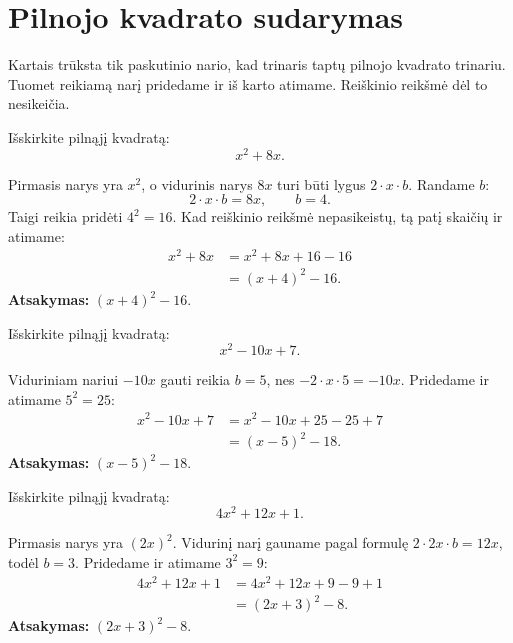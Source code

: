 \documentclass[11pt,a4paper]{scrartcl}
\begin{document}
\section{Pilnojo kvadrato sudarymas}

Kartais trūksta tik paskutinio nario, kad trinaris taptų pilnojo kvadrato trinariu. Tuomet reikiamą narį pridedame ir iš karto atimame. Reiškinio reikšmė dėl to nesikeičia.

\begin{example}
Išskirkite pilnąjį kvadratą:
\[
x^2+8x.
\]
\end{example}
\begin{solution}
Pirmasis narys yra $x^2$, o vidurinis narys $8x$ turi būti lygus $2\cdot x\cdot b$. Randame $b$:
\[
2\cdot x\cdot b=8x, \qquad b=4.
\]
Taigi reikia pridėti $4^2=16$. Kad reiškinio reikšmė nepasikeistų, tą patį skaičių ir atimame:
\[
\begin{aligned}
x^2+8x
&=x^2+8x+16-16\\
&=(x+4)^2-16.
\end{aligned}
\]
\textbf{Atsakymas:} $(x+4)^2-16$.
\end{solution}

\begin{example}
Išskirkite pilnąjį kvadratą:
\[
x^2-10x+7.
\]
\end{example}
\begin{solution}
Viduriniam nariui $-10x$ gauti reikia $b=5$, nes $-2\cdot x\cdot5=-10x$. Pridedame ir atimame $5^2=25$:
\[
\begin{aligned}
x^2-10x+7
&=x^2-10x+25-25+7\\
&=(x-5)^2-18.
\end{aligned}
\]
\textbf{Atsakymas:} $(x-5)^2-18$.
\end{solution}

\begin{example}
\small
Išskirkite pilnąjį kvadratą:
\[
4x^2+12x+1.
\]
\end{example}
\begin{solution}
Pirmasis narys yra $(2x)^2$. Vidurinį narį gauname pagal formulę $2\cdot2x\cdot b=12x$, todėl $b=3$. Pridedame ir atimame $3^2=9$:
\[
\begin{aligned}
4x^2+12x+1
&=4x^2+12x+9-9+1\\
&=(2x+3)^2-8.
\end{aligned}
\]
\textbf{Atsakymas:} $(2x+3)^2-8$.
\end{solution}
\end{document}
